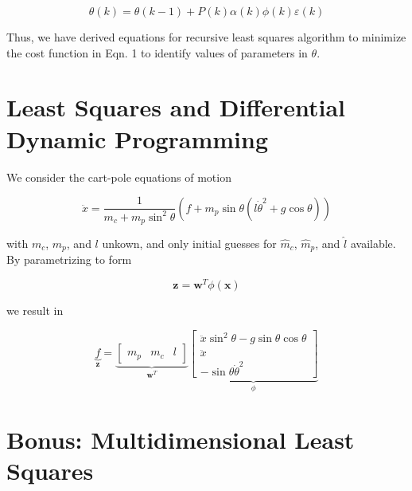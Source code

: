 \documentclass{article}
\begin{document}
\begin{equation}
\theta(k) = \theta(k-1) + P(k) \alpha(k) \phi(k) \varepsilon(k)
\end{equation}

Thus, we have derived equations for recursive least squares algorithm to minimize the cost function in Eqn. 1 to identify values of parameters in $\theta$.

\section{Least Squares and Differential Dynamic Programming}

We consider the cart-pole equations of motion

\begin{equation}
\ddot{x} = \frac{1}{m_c + m_p \sin^2 \theta} (f + m_p \sin \theta (l \dot{\theta}^2 + g \cos \theta))
\end{equation}

with $m_c$, $m_p$, and $l$ unkown, and only initial guesses for $\hat{m}_c$, $\hat{m}_p$, and $\hat{l}$ available. By parametrizing to form

\begin{equation}
\mathbf{z} = \mathbf{w}^T \phi(\mathbf{x})
\end{equation}

we result in

\begin{equation}
\underbrace{f}_{\mathbf{z}} = 
\underbrace{
\begin{bmatrix}
m_p & m_c & l
\end{bmatrix}}_{\mathbf{w}^T}
\underbrace{
\begin{bmatrix}
\ddot{x} \sin^2 \theta - g \sin \theta \cos \theta \\
\ddot{x} \\
- \sin \theta \dot{\theta}^2
\end{bmatrix}}_{\phi}
\end{equation}

\section{Bonus: Multidimensional Least Squares}
\end{document}

